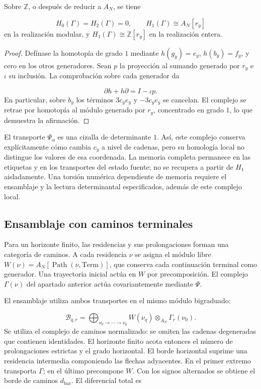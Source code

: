 \begin{proposition}
\label{x_reciprocidad:iv:cont:memoria-homologia}
Sobre \(\mathbb Z\), o después de reducir a \(A_N\), se tiene

\[
H_0(\Gamma)=H_2(\Gamma)=0,
\qquad H_1(\Gamma)\cong A_N[r_y]
\]
en la realización modular, y \(H_1(\Gamma)\cong\mathbb Z[r_y]\) en la realización entera.

\end{proposition}
\begin{proof}
Defínase la homotopía de grado \(1\) mediante \(h(g_y)=e_y\), \(h(b_y)=f_y\), y cero en los otros generadores. Sean \(p\) la proyección al sumando generado por \(r_y\) e \(\iota\) su inclusión. La comprobación sobre cada generador da

\[
\partial h+h\partial=I-\iota p.
\]
En particular, sobre \(b_y\) los términos \(3c_ye_y\) y \(-3c_ye_y\) se cancelan. El complejo se retrae por homotopía al módulo generado por \(r_y\), concentrado en grado \(1\), lo que demuestra la afirmación.
\end{proof}

El transporte \(\Psi_\alpha\) es una cizalla de determinante \(1\). Así, este complejo conserva explícitamente cómo cambia \(c_y\) a nivel de cadenas, pero su homología local no distingue los valores de esa coordenada. La memoria completa permanece en las etiquetas y en los transportes del estado fuente; no se recupera a partir de \(H_1\) aisladamente. Una torsión numérica dependiente de memoria requiere el ensamblaje y la lectura determinantal especificados, además de este complejo local.

\subsection{Ensamblaje con caminos terminales}
\label{x_reciprocidad:iv:cont:ensamblaje}
Para un horizonte finito, las residencias y sus prolongaciones forman una categoría de caminos. A cada residencia \(\nu\) se asigna el módulo libre \(W(\nu)=A_N[\operatorname{Path}(\nu,\mathrm{Term})]\), que conserva cada continuación terminal como generador. Una trayectoria inicial actúa en \(W\) por precomposición. El complejo \(\Gamma(\nu)\) del apartado anterior actúa covariantemente mediante \(\Psi\).

El ensamblaje utiliza ambos transportes en el mismo módulo bigraduado:

\[
\mathcal B_{q,r}=
\bigoplus_{\nu_0\to\cdots\to\nu_q}
W(\nu_q)\otimes_{A_N}\Gamma_r(\nu_0).
\]
Se utiliza el complejo de caminos normalizado: se omiten las cadenas degeneradas que contienen identidades. El horizonte finito acota entonces el número de prolongaciones estrictas y el grado horizontal. El borde horizontal suprime una residencia intermedia componiendo las flechas adyacentes. En el primer extremo transporta \(\Gamma\); en el último precompone \(W\). Con los signos alternados se obtiene el borde de caminos \(d_{\mathrm{bar}}\). El diferencial total es

